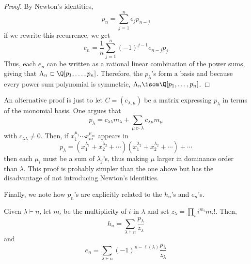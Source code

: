 \documentclass[11pt,leqno,oneside]{amsart}
\numberwithin{thm}{section}
\newcommand{\partitionof}{\vdash}
\newcommand{\strictlydominates}{\rhd}
\newcommand{\sym}{\Lambda}
\begin{document}
\begin{proof}
  By Newton's identities, \[
    p_n = \sum_{j=1}^n e_j p_{n-j}
  \]
  if we rewrite this recurrence, we get \[
    e_n = \frac{1}{n}\sum_{j=1}^n (-1)^{j-1} e_{n-j} p_j
  \]
  Thus, each \(e_n\) can be written as a rational linear combination
  of the power sums, giving that \(\sym_n \subset \Q[p_1, \ldots,
  p_n]\). Therefore, the \(p_\lambda\)'s form a basis and because
  every power sum polynomial is symmetric, \(\sym_n \isom \Q[p_1,
  \ldots, p_n]\).
\end{proof}
\begin{rmk}
  An alternative proof is just to let \(C=(c_{\lambda,\mu})\) be a
  matrix expressing \(p_\lambda\) in terms of the monomial basis. One
  argues that \[
    p_{\lambda} = c_{\lambda \lambda}m_{\lambda} + \sum_{\mu
      \strictlydominates \lambda} c_{\lambda \mu} m_{\mu}
  \]
  with \(c_{\lambda \lambda} \neq 0\). Then, if \(x_1^{\mu_1} \cdots
  x_m^{\mu_m}\) appears in \[
    p_\lambda = (x_1^{\lambda_1} + x_2^{\lambda_2} +
    \cdots)(x_1^{\lambda_2}+x_2^{\lambda_2}+ \cdots )+\cdots
  \]
  then each \(\mu_i\) must be a sum of \(\lambda_j\)'s, thus making
  \(\mu\) larger in dominance order than \(\lambda\). This proof is
  probably simpler than the one above but has the disadvantage of not
  introducing Newton's identities.
\end{rmk}
Finally, we note how \(p_n\)'s are explicitly related to the \(h_n\)'s
and \(e_n\)'s.
\begin{prop}\label{hn-in-terms-of-pn}
  Given \(\lambda \partitionof n\), let \(m_i\) be the
    multiplicity of \(i\) in \(\lambda\) and set \(z_\lambda = \prod_i
    i^{m_i} m_i!\). Then,
    \[
      h_n = \sum_{\lambda \partitionof n} \frac{p_\lambda}{z_\lambda}
    \]
    and \[
      e_n = \sum_{\lambda \partitionof n} (-1)^{n-\ell(\lambda)}
      \frac{p_\lambda}{z_\lambda} 
    \]
\end{prop}
\end{document}
